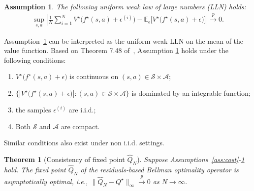 \documentclass[letterpaper, 10 pt, conference]{ieeeconf}  %
\newtheorem{theorem}{Theorem}
\newtheorem{assumption}{Assumption}
\begin{document}
\begin{assumption}\label{ass:LLN}
The following uniform weak law of large numbers (LLN) holds:
\small
\begin{align}
\sup_{s,a}
\left|
\frac{1}{N}\sum_{i=1}^{N} V^\star\bigl(f^\star(s,a)+\epsilon^{(i)}\bigr)
-\mathbb E_{\epsilon}\bigl[V^\star\bigl(f^\star(s,a)+\epsilon\bigr)\bigr]
\right|
\xrightarrow{p} 0.
\end{align}
\normalsize
\end{assumption}
Assumption\ \ref{ass:LLN} can be interpreted as the uniform weak LLN on the mean of the value function. Based on Theorem 7.48 of\ \cite{shapiro2021lectures}, Assumption \ref{ass:LLN} holds under the following conditions: 
\begin{enumerate}
\item $V^\star\!\bigl(f^\star (s,a)+\epsilon\bigr)$ is continuous on $(s,a) \in \mathcal S \times \mathcal A$;
\item $\{|V^\star\!\bigl(f^\star (s,a)+\epsilon\bigr)|:(s,a) \in \mathcal S \times \mathcal A\}$ is dominated by an integrable function;
\item the samples $\epsilon^{(i)}$ are i.i.d.;
\item Both $\mathcal S$ and $\mathcal{A}$ are compact.
\end{enumerate} Similar conditions also exist under non i.i.d. settings.
\begin{theorem}[Consistency of fixed point $\hat{Q}_N$]
\label{thm:consistency} Suppose Assumptions\ \ref{ass:cost}-\ref{ass:LLN} hold. The fixed point $\hat{Q}_N$ of the residuals-based Bellman optimality operator is asymptotically optimal, i.e., $\|\hat Q_N-Q^\star\|_\infty \xrightarrow{p} 0$ as $N\to\infty$.
\end{theorem}
\end{document}
